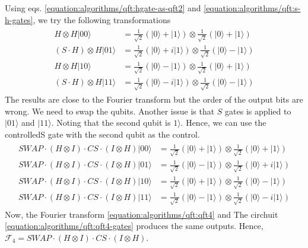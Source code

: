 \documentclass[letterpaper,10pt,english]{jupyterBook}
\begin{document}
\sphinxAtStartPar
Using eqs. \eqref{equation:algorithms/qft:hgate-as-qft2} and \eqref{equation:algorithms/qft:s-h-gates}, we try the following transformations
\begin{equation*}
\begin{split}
\begin{align}
H \otimes H |00\rangle & = \frac{1}{\sqrt{2}} \left(|0\rangle + |1\rangle\right) \otimes
\frac{1}{\sqrt{2}} \left(|0\rangle + |1\rangle\right) \\
(S\cdot H) \otimes H |01\rangle & = \frac{1}{\sqrt{2}}\left(|0\rangle + i |1\rangle\right)  \otimes
 \frac{1}{\sqrt{2}} \left(|0\rangle - |1\rangle\right) \\
H \otimes H |10\rangle & = \frac{1}{\sqrt{2}} \left(|0\rangle - |1\rangle\right) \otimes
\frac{1}{\sqrt{2}} \left(|0\rangle + |1\rangle\right) \\
(S\cdot H) \otimes H |11\rangle & = \frac{1}{\sqrt{2}}\left(|0\rangle - i |1\rangle\right)  \otimes
 \frac{1}{\sqrt{2}} \left(|0\rangle - |1\rangle\right)
\end{align}
\end{split}
\end{equation*}
\sphinxAtStartPar
The results are close to the Fourier transform but the order of the output bits are wrong.  We need to swap the qubits.  Another issue is that \(S\) gates is applied to \(|01\rangle\) and \(|11\rangle\).  Noting that the second qubit is \(1\rangle\).  Hence, we can use the controlled\sphinxhyphen{}S gate with the second qubit as the control.
\begin{equation}\label{equation:algorithms/qft:qft4-gates}
\begin{split}
\begin{align}
SWAP \cdot (H \otimes I) \cdot CS \cdot (I \otimes H) |00\rangle & = \frac{1}{\sqrt{2}} \left(|0\rangle + |1\rangle\right) \otimes
\frac{1}{\sqrt{2}} \left(|0\rangle + |1\rangle\right) \\
SWAP \cdot (H \otimes I) \cdot CS \cdot (I \otimes H)  |01\rangle & = \frac{1}{\sqrt{2}} \left(|0\rangle - |1\rangle\right) \otimes  \frac{1} {\sqrt{2}}\left(|0\rangle + i |1\rangle\right)
 \\
SWAP \cdot (H \otimes I) \cdot CS \cdot (I \otimes H) |10\rangle  & = \frac{1}{\sqrt{2}} \left(|0\rangle + |1\rangle\right)  \otimes
 \frac{1}{\sqrt{2}} \left(|0\rangle - |1\rangle\right) \\
SWAP \cdot (H \otimes I) \cdot CS \cdot (I \otimes H) |11\rangle & =  \frac{1}{\sqrt{2}} \left(|0\rangle - |1\rangle\right)   \otimes
\frac{1}{\sqrt{2}}\left(|0\rangle - i |1\rangle\right)
\end{align}
\end{split}
\end{equation}
\sphinxAtStartPar
Now, the Fourier transform \eqref{equation:algorithms/qft:qft4} and The circhuit \eqref{equation:algorithms/qft:qft4-gates} produces the same outputs.  Hence, \(\mathcal{F}_4 = SWAP \cdot (H \otimes I) \cdot CS \cdot (I \otimes H)\).
\end{document}
